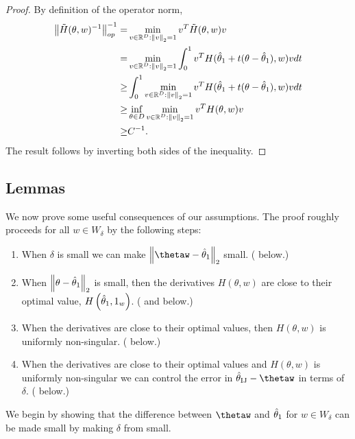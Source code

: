 \begin{proof}
%
By definition of the operator norm,
%
\begin{align*}
\left\Vert \tilde{H}(\theta, w)^{-1}\right\Vert_{op}^{-1} =&
    \min_{v \in \mathbb{R}^D: \left\Vert v\right\Vert_2 = 1} v^T \tilde{H}(\theta, w) v \\
=& \min_{v \in \mathbb{R}^D: \left\Vert v\right\Vert_2 = 1}
    \int_0^1 v^T H(\hat{\theta}_{1} + t (\theta - \hat{\theta}_{1}), w) v dt \\
\ge& \int_0^1 \min_{v \in \mathbb{R}^D: \left\Vert v\right\Vert_2 = 1}
    v^T H(\hat{\theta}_{1} + t (\theta - \hat{\theta}_{1}), w) v dt \\
\ge& \inf_{\theta \in D} \min_{v \in \mathbb{R}^D: \left\Vert v\right\Vert_2 = 1}
        v^T H(\theta, w) v \\
\ge& C^{-1}.
\end{align*}
%
The result follows by inverting both sides of the inequality.
%
\end{proof}






\subsection{Lemmas}

We now prove some useful consequences of our assumptions. The proof
roughly proceeds for all $w\in W_{\delta}$ by the following steps:
%
\begin{enumerate}
\item When $\delta$ is small we can make $\norm{{{\thetaw}}-\thetaone}_{2}$
small. ( below.)
\item When $\left\Vert \theta-\hat{\theta}_{1}\right\Vert_{2}$ is small, then the derivatives
$H\left(\theta,w\right)$ are close to their optimal value, $H\left(\hat{\theta}_{1},1_{w}\right)$.
( and 
below.)
\item When the derivatives are close to their optimal values, then $H\left(\theta,w\right)$
is uniformly non-singular. ( below.)
\item When the derivatives are close to their optimal values and $H\left(\theta,w\right)$
is uniformly non-singular we can control the error in $\thetaij-\thetaw$
in terms of $\delta$. ( below.)
\end{enumerate}
%
We begin by showing that the difference between $\thetaw$ and $\hat{\theta}_{1}$
for $w\in W_{\delta}$ can be made small by making $\delta$ from
 small.

